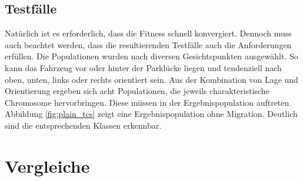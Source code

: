 \documentclass[12pt,a4paper]{article}
\begin{document}
\subsection{Testfälle}
Natürlich ist es erforderlich, dass die Fitness schnell konvergiert. Dennoch muss auch beachtet werden, dass die resultierenden Testfälle auch die Anforderungen erfüllen. Die Populationen wurden nach diversen Gesichtspunkten ausgewählt. So kann das Fahrzeug vor oder hinter der Parklücke liegen und tendenziell nach oben, unten, links oder rechts orientiert sein. Aus der Kombination von Lage und Orientierung ergeben sich acht Populationen, die jeweils charakteristische Chromosome hervorbringen. Diese müssen in der Ergebnispopulation auftreten.
Abbildung \ref{fig:plain_tcs} zeigt eine Ergebnispopulation ohne Migration. Deutlich sind die entsprechenden Klassen erkennbar.

\section{Vergleiche}
\end{document}
